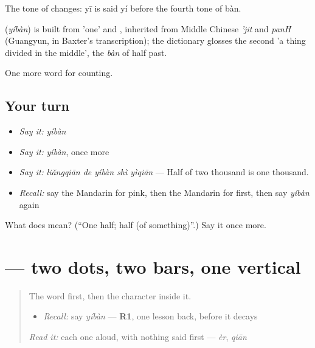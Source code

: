 The tone of  changes: yī is said yí before the fourth tone of bàn.

\begin{cousinweb}
\textbf{} (\emph{yíbàn}) is built from  'one' and , inherited from Middle Chinese \emph{'jit} and \emph{panH} (Guangyun, in Baxter's transcription); the dictionary glosses the second 'a thing divided in the middle', the \emph{bàn} of half past.
\end{cousinweb}

\begin{grammarlens}[title={What you've built}]
One more word for counting.
\end{grammarlens}

\subsection*{Your turn}
\begin{itemize}
\raggedright
  \item \emph{Say it:} \emph{yíbàn}
  \item \emph{Say it:} \emph{yíbàn}, once more
  \item \emph{Say it:} \emph{liǎngqiān de yíbàn shì yìqiān} — Half of two thousand is one thousand.
  \item \emph{Recall:} say the Mandarin for pink, then the Mandarin for first, then say \emph{yíbàn} again
\end{itemize}

\begin{tcolorbox}[breakable,colback=teal!4,colframe=teal!35!black,title={Before you move on}]
What does  mean? (\textquotedblleft{}One half; half (of something)\textquotedblright{}.) Say it once more.
\end{tcolorbox}
\section[\texorpdfstring{\zh{半} (bàn)}{半 (bàn)}]{ — two dots, two bars, one vertical}

\label{lesson:ZH-W140-ban-half}



\begin{quote}
The word first, then the character inside it.

\begin{itemize}
\raggedright
  \item \emph{Recall:} say \emph{yíbàn} — \textbf{R1}, one lesson back, before it decays
\end{itemize}

\begin{quote}
 
\end{quote}

\emph{Read it:} each one aloud, with nothing said first — \emph{èr}, \emph{qiān}
\end{quote}

